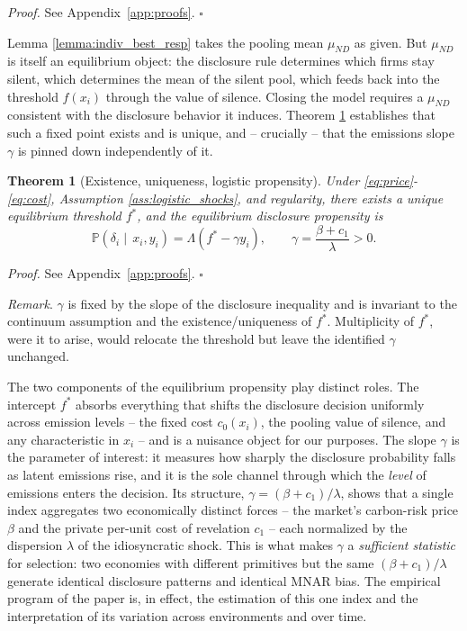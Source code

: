 \documentclass[a4paper,12pt]{article}
\newtheorem{theorem}{Theorem}[section]
\begin{document}
\textit{Proof.} See Appendix~\ref{app:proofs}. \hfill $\square$


Lemma \ref{lemma:indiv_best_resp} takes the pooling mean $\mu_{ND}$ as given. But $\mu_{ND}$ is itself an equilibrium object: the disclosure rule determines which firms stay silent, which determines the mean of the silent pool, which feeds back into the threshold $f(x_i)$ through the value of silence. Closing the model requires a $\mu_{ND}$ consistent with the disclosure behavior it induces. Theorem \ref{thm:existence} establishes that such a fixed point exists and is unique, and -- crucially -- that the emissions slope $\gamma$ is pinned down independently of it.

\begin{theorem}[Existence, uniqueness, logistic propensity] \label{thm:existence}
Under \eqref{eq:price}-\eqref{eq:cost}, Assumption \ref{ass:logistic_shocks}, and regularity, there exists a unique equilibrium threshold $f^*$, and the equilibrium disclosure propensity is 
\begin{equation}
\label{eq:threshold}
\mathbb{P}(\delta_i \mid \, x_i, y_i) = \Lambda(  f^* - \gamma y_i), \qquad \gamma = \frac{\beta + c_1}{\lambda} > 0. 
\end{equation}

\end{theorem}
\textit{Proof.} See Appendix~\ref{app:proofs}. \hfill $\square$

\textit{Remark}. $\gamma$ is fixed by the slope of the disclosure inequality and is invariant to the continuum assumption and the existence/uniqueness of $f^*$. Multiplicity of $f^*$, were it to arise, would relocate the threshold but leave the identified $\gamma$ unchanged.

The two components of the equilibrium propensity play distinct roles. The intercept $f^*$ absorbs everything that shifts the disclosure decision uniformly across emission levels -- the fixed cost $c_0(x_i)$, the pooling value of silence, and any characteristic in $x_i$ -- and is a nuisance object for our purposes. The slope $\gamma$ is the parameter of interest: it measures how sharply the disclosure probability falls as latent emissions rise, and it is the sole channel through which the \emph{level} of emissions enters the decision. Its structure, $\gamma = (\beta + c_1)/\lambda$, shows that a single index aggregates two economically distinct forces -- the market's carbon-risk price $\beta$ and the private per-unit cost of revelation $c_1$ -- each normalized by the dispersion $\lambda$ of the idiosyncratic shock. This is what makes $\gamma$ a \emph{sufficient statistic} for selection: two economies with different primitives but the same $(\beta + c_1)/\lambda$ generate identical disclosure patterns and identical MNAR bias. The empirical program of the paper is, in effect, the estimation of this one index and the interpretation of its variation across environments and over time.
\end{document}
